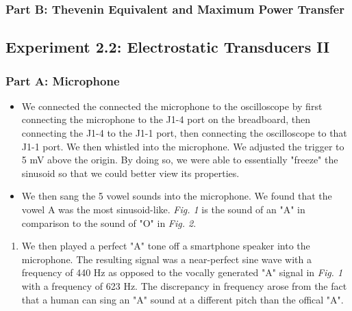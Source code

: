 \documentclass[10pt]{article}
\begin{document}
\subsubsection{Part B: Thevenin Equivalent and Maximum Power Transfer}
 

\subsection{Experiment 2.2: Electrostatic Transducers II}
\subsubsection{Part A: Microphone}
\begin{itemize}
	\item We connected the connected the microphone to the oscilloscope by first connecting the microphone to the J1-4 port on the breadboard, then connecting the J1-4 to the J1-1 port, then connecting the oscilloscope to that J1-1 port. We then whistled into the microphone. We adjusted the trigger to 5 mV above the origin. By doing so, we were able to essentially "freeze" the sinusoid so that we could better view its properties. 
	\item We then sang the 5 vowel sounds into the microphone. We found that the vowel A was the most sinusoid-like. \textit{Fig. 1} is the sound of an "A" in comparison to the sound of "O" in \textit{Fig. 2}. 
\end{itemize}

\begin{enumerate}
	\item  We then played a perfect "A" tone off a smartphone speaker into the microphone. The resulting signal was a near-perfect sine wave with a frequency of 440 Hz as opposed to the vocally generated "A" signal in \textit{Fig. 1} with a frequency of 623 Hz. The discrepancy in frequency arose from the fact that a human can sing an "A" sound at a different pitch than the offical "A". 
\end{enumerate}
\end{document}
